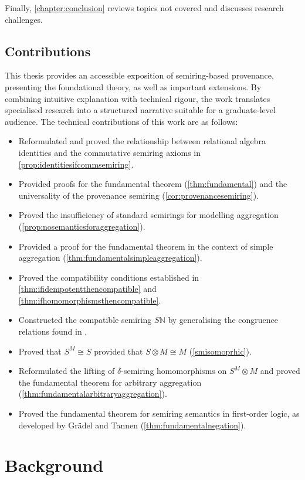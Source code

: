 \documentclass[oneside, 11pt]{amsbook}
\theoremstyle{plain}
\theoremstyle{definition}
\theoremstyle{remark}
\begin{document}
Finally, \autoref{chapter:conclusion} reviews topics not covered and discusses research challenges.

\section{Contributions}

This thesis provides an accessible exposition of semiring-based provenance, presenting the foundational theory, as well as important extensions. By combining intuitive explanation with technical rigour, the work translates specialised research into a structured narrative suitable for a graduate-level audience. The technical contributions of this work are as follows:
\begin{itemize}
    \item Reformulated and proved the relationship between relational algebra identities and the commutative semiring axioms in \autoref{prop:identitiesifcommsemiring}.
    \item Provided proofs for the fundamental theorem (\autoref{thm:fundamental}) and the universality of the provenance semiring (\autoref{cor:provenancesemiring}).
    \item Proved the insufficiency of standard semirings for modelling aggregation (\autoref{prop:nosemanticsforaggregation}).
    \item Provided a proof for the fundamental theorem in the context of simple aggregation (\autoref{thm:fundamentalsimpleaggregation}).
    \item Proved the compatibility conditions established in \autoref{thm:ifidempotentthencompatible} and \autoref{thm:ifhomomorphismsthencompatible}.
    \item Constructed the compatible semiring $S\mathbb{N}$ by generalising the congruence relations found in \cite{Amsterdamer2011b}.
    \item Proved that $S^M \cong S$ provided that $S \otimes M \cong M$ (\autoref{smisomoprhic}).
    \item Reformulated the lifting of $\delta$-semiring homomorphisms on $S^M \otimes M$ and proved the fundamental theorem for arbitrary aggregation (\autoref{thm:fundamentalarbitraryaggregation}).
    \item Proved the fundamental theorem for semiring semantics in first-order logic, as developed by Grädel and Tannen (\autoref{thm:fundamentalnegation}).
\end{itemize}

\chapter{Background}
\label{chapter:background}
\end{document}
